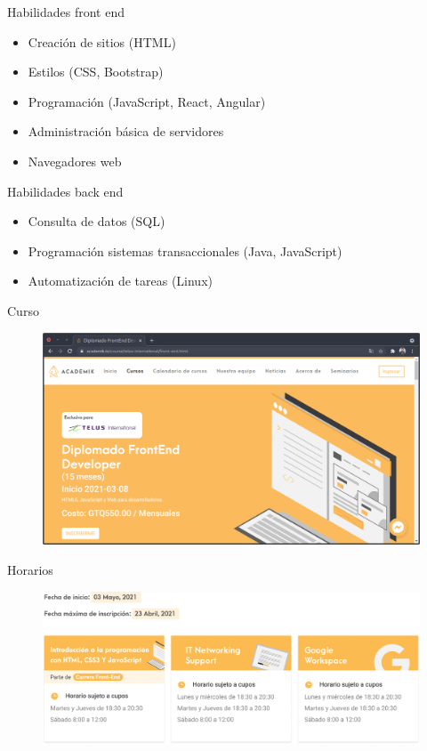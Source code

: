 \documentclass[aspectratio=169]{beamer}
\begin{document}
\begin{frame}{Habilidades front end}
	\begin{itemize}
		\item Creación de sitios (HTML)
		\item Estilos (CSS, Bootstrap)
		\item Programación (JavaScript, React, Angular)
		\item Administración básica de servidores
		\item Navegadores web
	\end{itemize}
\end{frame}

\begin{frame}{Habilidades back end}
	\begin{itemize}
		\item Consulta de datos (SQL)
		\item Programación sistemas transaccionales (Java, JavaScript)
		\item Automatización de tareas (Linux)
	\end{itemize}
\end{frame}


\begin{frame}{Curso}
	\begin{figure}
		\centering
		\includegraphics[width=\linewidth]{Images/curso}
	\end{figure}
\end{frame}

\begin{frame}{Horarios}
	\begin{figure}
		\centering
		\includegraphics[width=\linewidth]{Images/horarios}
	\end{figure}
\end{frame}
\end{document}
